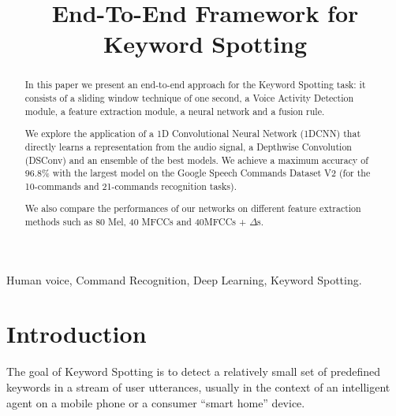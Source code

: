 \documentclass[conference]{IEEEtran}
\begin{document}
\title{End-To-End Framework for Keyword Spotting}
\author{
\and
{}
}

\maketitle

\begin{abstract}
In this paper we present an end-to-end approach for the Keyword Spotting task: it consists of a sliding window technique of one second, a Voice Activity Detection module, a feature extraction module, a neural network and a fusion rule.

We explore the application of a 1D Convolutional Neural Network (1DCNN) that directly learns a representation from the audio signal, a Depthwise Convolution (DSConv) and an ensemble of the best models.
We achieve a maximum accuracy of 96.8\% with the largest model on the Google Speech Commands Dataset V2 (for the 10-commands and 21-commands recognition tasks).

We also compare the performances of our networks on different feature extraction methods such as 80 Mel, 40 MFCCs and 40MFCCs + $\Delta$s.
\end{abstract}

\IEEEpeerreviewmaketitle
\begin{IEEEkeywords}
Human voice, Command Recognition, Deep Learning, Keyword Spotting.
\end{IEEEkeywords}

\section{Introduction}
The goal of Keyword Spotting is to detect a relatively small set of predefined keywords in a stream of user utterances, usually in the context of an intelligent agent on a mobile phone or a consumer “smart home” device.
\end{document}
